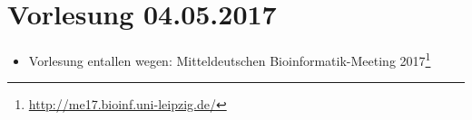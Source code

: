 \section{Vorlesung 04.05.2017}

\begin{itemize}
	\item Vorlesung entallen wegen: Mitteldeutschen Bioinformatik-Meeting 2017\footnote{\url{http://me17.bioinf.uni-leipzig.de/}}
\end{itemize}